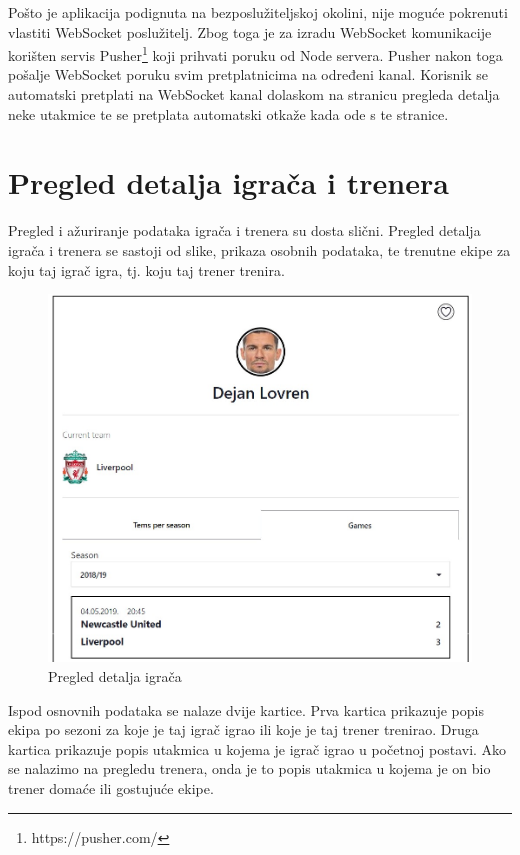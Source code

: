 \documentclass[times, utf8, zavrsni]{fer}
\begin{document}
Pošto je aplikacija podignuta na bezposlužiteljskoj okolini, nije moguće pokrenuti vlastiti WebSocket poslužitelj.
Zbog toga je za izradu WebSocket komunikacije korišten servis Pusher\footnote{https://pusher.com/} koji prihvati poruku od Node servera.
Pusher nakon toga pošalje WebSocket poruku svim pretplatnicima na određeni kanal.
Korisnik se automatski pretplati na WebSocket kanal dolaskom na stranicu pregleda detalja neke utakmice te se pretplata automatski otkaže kada ode s te stranice.

\section{Pregled detalja igrača i trenera}

Pregled i ažuriranje podataka igrača i trenera su dosta slični. Pregled detalja igrača i trenera se sastoji od slike, prikaza osobnih podataka, te trenutne ekipe za koju taj igrač igra, tj. koju taj trener trenira.

\begin{figure}[htb]
\centering
\includegraphics[width=12cm]{images/lovren.jpg}
\caption{Pregled detalja igrača}
\label{fig:player}
\end{figure}

Ispod osnovnih podataka se nalaze dvije kartice. Prva kartica prikazuje popis ekipa po sezoni za koje je taj igrač igrao ili koje je taj trener trenirao.
Druga kartica prikazuje popis utakmica u kojema je igrač igrao u početnoj postavi. Ako se nalazimo na pregledu trenera, onda je to popis utakmica u kojema je on bio trener domaće ili gostujuće ekipe.
\end{document}
